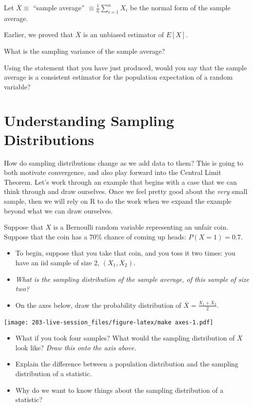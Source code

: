 \documentclass[
]{book}
\providecommand{\tightlist}{%
  \setlength{\itemsep}{0pt}\setlength{\parskip}{0pt}}
\theoremstyle{definition}
\theoremstyle{definition}
\theoremstyle{definition}
\theoremstyle{definition}
\theoremstyle{remark}
\begin{document}
Let \(\overline{X} \equiv\) ``sample average'' \(\equiv \frac{1}{n}\sum_{i=1}^{n}X_{i}\) be the normal form of the sample average.

Earlier, we proved that \(\overline{X}\) is an unbiased estimator of \(E[X]\).

What is the sampling variance of the sample average?

\vspace{20cm}

Using the statement that you have just produced, would you say that the sample average is a consistent estimator for the population expectation of a random variable?

\hypertarget{understanding-sampling-distributions}{%
\section{Understanding Sampling Distributions}\label{understanding-sampling-distributions}}

How do sampling distributions change as we add data to them? This is going to both motivate convergence, and also play forward into the Central Limit Theorem.
Let's work through an example that begins with a case that we can think through and draw ourselves. Once we feel pretty good about the \emph{very} small sample, then we will rely on R to do the work when we expand the example beyond what we can draw ourselves.

Suppose that \(X\) is a Bernoulli random variable representing an unfair coin. Suppose that the coin has a 70\% chance of coming up heads: \(P(X=1) = 0.7\).

\begin{itemize}
\tightlist
\item
  To begin, suppose that you take that coin, and you toss it two times: you have an iid sample of size 2, \((X_1,X_2)\).
\item
  \emph{What is the sampling distribution of the sample average, of this sample of size two?}
\item
  On the axes below, draw the probability distribution of \(\overline X = \frac{X_1+X_2}{2}\).
\end{itemize}

\texttt{[image: 203-live-session\_files/figure-latex/make axes-1.pdf]}

\begin{itemize}
\tightlist
\item
  What if you took four samples? What would the sampling distribution of \(\overline{X}\) look like? \emph{Draw this onto the axis above.}
\item
  Explain the difference between a population distribution and the sampling distribution of a statistic.
\item
  Why do we want to know things about the sampling distribution of a statistic?
\end{itemize}
\end{document}
